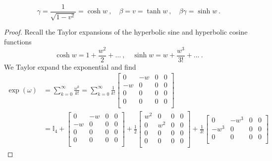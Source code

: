 \begin{example}
        \begin{equation}\label{rap}
            \gamma = \frac{1}{\sqrt{1 - v^2}} = \cosh w ~, \quad \beta = v = \tanh w ~, \quad \beta \gamma = \sinh w ~.
        \end{equation}
        \begin{proof}
            Recall the Taylor expansions of the hyperbolic sine and hyperbolic cosine functions
            \begin{equation*}
                \cosh w = 1 + \frac{w^2}{2} + \ldots ~, \quad \sinh w = w + \frac{w^3}{3!} + \ldots ~.
            \end{equation*}
            We Taylor expand the exponential and find
            \begin{equation*}
            \begin{aligned}
                \exp(\omega) & = \sum_{k = 0}^\infty \frac{\omega^k}{k!} = \sum_{k=0}^{\infty} \frac{1}{k!} \begin{bmatrix}
                    0 & - w & 0 & 0 \\
                    - w & 0 & 0 & 0 \\
                    0 & 0 & 0 & 0 \\
                    0 & 0 & 0 & 0 \\
                \end{bmatrix} \\ & = \mathbb I_4 + \begin{bmatrix}
                    0 & - w & 0 & 0 \\
                    - w & 0 & 0 & 0 \\
                    0 & 0 & 0 & 0 \\
                    0 & 0 & 0 & 0 \\
                \end{bmatrix} + \frac{1}{2}\begin{bmatrix}
                    w^2 & 0 & 0 & 0 \\
                    0 & w^2 & 0 & 0 \\
                    0 & 0 & 0 & 0 \\
                    0 & 0 & 0 & 0 \\
                \end{bmatrix} + \frac{1}{3!} \begin{bmatrix}
                    0 & - w^3 & 0 & 0 \\
                    - w^3 & 0 & 0 & 0 \\
                    0 & 0 & 0 & 0 \\

\end{bmatrix}
\end{aligned}
\end{equation*}
\end{proof}
\end{example}
